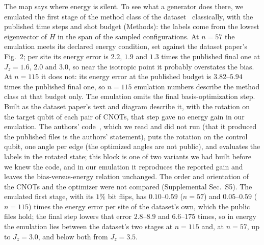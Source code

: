 \documentclass[aps,prx,twocolumn,10pt,superscriptaddress,nofootinbib,longbibliography,floatfix]{revtex4-2}
\theoremstyle{remark}
\newcommand{\Jz}{J_z}
\begin{document}
The map says where energy is silent. To see what a generator does there, we emulated the first stage of the method
class of the dataset~\cite{jaderberg2026,yu2025skqd} classically, with the published time steps and shot budget (Methods): the labels come from
the lowest eigenvector of $H$ in the span of the sampled configurations. At $n=57$ the emulation meets its declared %
energy condition, set against the dataset paper's Fig.~2; per site its energy error is $2.2$, $1.9$ and $1.3$ times %
the published final one at $\Jz=1.6$, $2.0$ and $3.0$, so near the isotropic point it probably overstates the bias. At %
$n=115$ it does not: its energy error at the published budget is $3.82$--$5.94$ times the %
published final one, so $n=115$ emulation numbers describe the method class at that budget only. The emulation
omits the final basis-optimization step. Built as the dataset paper's text and diagram describe it, with the rotation
on the target qubit of each pair of CNOTs, that step gave no energy gain in our emulation. The authors'
code~\cite{jaderberg2026data}, which we read and did not run (that it produced the published files is the authors'
statement), puts the rotation on the control qubit, one angle per
edge (the optimized angles are not public), and evaluates the labels in the rotated state; this block is one of two
variants we had built before we knew the code, and in our emulation it reproduces the reported gain and leaves the
bias-versus-energy relation unchanged. The order and orientation of the CNOTs and the optimizer were not compared (Supplemental
Sec.~S5). The emulated first stage, with its $1\%$ bit flips, has $0.10$--$0.59$ ($n=57$) and $0.05$--$0.59$ %
($n=115$) times the energy error per site of the dataset's own, which the public files hold; the final step lowers %
that error $2.8$--$8.9$ and $6.6$--$175$ times, so in energy the emulation lies between the dataset's two stages %
at $n=115$ and, at $n=57$, up to $\Jz=3.0$, and below both from $\Jz=3.5$. %
\end{document}
